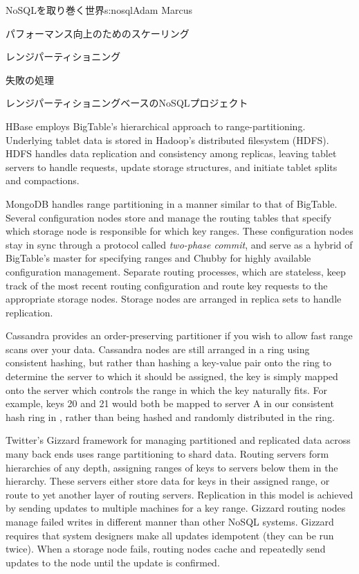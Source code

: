 \begin{aosachapter}{NoSQLを取り巻く世界}{s:nosql}{Adam Marcus}
\begin{aosasect1}{パフォーマンス向上のためのスケーリング}
\begin{aosasect2}{レンジパーティショニング}
\begin{aosasect3}{失敗の処理}
\end{aosasect3}

\begin{aosasect3}{レンジパーティショニングベースのNoSQLプロジェクト}

HBase employs BigTable's hierarchical approach to range-partitioning.
Underlying tablet data is stored in Hadoop's distributed filesystem
(HDFS).  HDFS handles data replication and consistency among replicas,
leaving tablet servers to handle requests, update storage structures,
and initiate tablet splits and compactions.

MongoDB handles range partitioning in a manner similar to that of
BigTable.  Several configuration nodes store and manage the routing
tables that specify which storage node is responsible for which key
ranges.  These configuration nodes stay in sync through a protocol
called \emph{two-phase commit}, and serve as a hybrid of BigTable's
master for specifying ranges and Chubby for highly available
configuration management.  Separate routing processes, which are
stateless, keep track of the most recent routing configuration and
route key requests to the appropriate storage nodes.  Storage nodes
are arranged in replica sets to handle replication.

Cassandra provides an order-preserving partitioner if you wish to
allow fast range scans over your data.  Cassandra nodes are still arranged
in a ring using consistent hashing, but rather than hashing a
key-value pair onto the ring to determine the server to which it
should be assigned, the key is simply mapped onto the server which
controls the range in which the key naturally fits.  For example, keys
20 and 21 would both be mapped to server A in our consistent hash ring
in , rather than being hashed and
randomly distributed in the ring.

Twitter's Gizzard framework for managing partitioned and replicated
data across many back ends uses range partitioning to shard data.
Routing servers form hierarchies of any depth, assigning ranges of
keys to servers below them in the hierarchy.  These servers either
store data for keys in their assigned range, or route to yet another
layer of routing servers.  Replication in this model is achieved by sending
updates to multiple machines for a key range.  Gizzard routing nodes
manage failed writes in different manner than other NoSQL systems.
Gizzard requires that system designers make all updates idempotent
(they can be run twice).  When a storage node fails, routing nodes
cache and repeatedly send updates to the node until the update is
confirmed.


\end{aosasect3}
\end{aosasect2}
\end{aosasect1}
\end{aosachapter}
